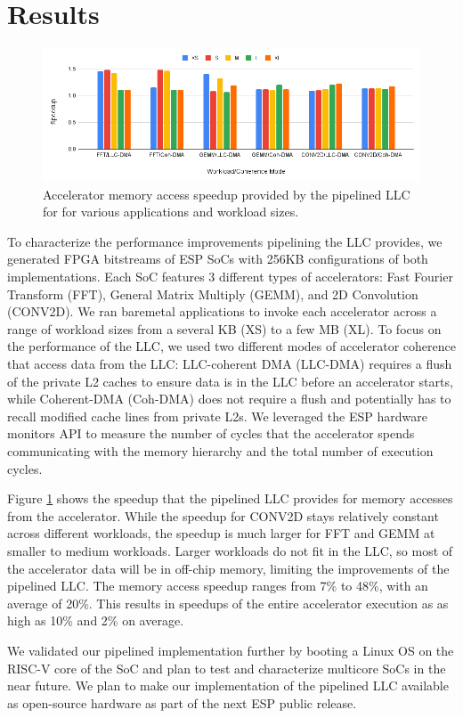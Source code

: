 \section{Results}
\label{sec:performanceTestResults}
\begin{figure}[t]
    \centering
    \captionsetup{justification=centering, format=hang}
    \includegraphics[width=1\linewidth]{fig/DMA_chart.png}
    \caption{Accelerator memory access speedup provided by the pipelined LLC for for various applications and workload sizes.}
    \label{fig:dma_chart}
\end{figure}

To characterize the performance improvements pipelining the LLC provides, we
generated FPGA bitstreams of ESP SoCs with 256KB configurations of both
implementations. Each SoC features 3 different types of accelerators: Fast
Fourier Transform (FFT), General Matrix Multiply (GEMM), and 2D Convolution
(CONV2D). We ran baremetal applications to invoke each accelerator across a
range of workload sizes from a several KB (XS) to a few MB (XL).  To
focus on the performance of the LLC, we used two different modes of accelerator
coherence that access data from the LLC: LLC-coherent DMA (LLC-DMA)
requires a flush of the private L2 caches to ensure data is in the LLC before an
accelerator starts, while Coherent-DMA (Coh-DMA) does not require a flush and
potentially has to recall modified cache lines from private L2s. We leveraged
the ESP hardware monitors API to measure the number of cycles that the
accelerator spends communicating with the memory hierarchy and the total number
of execution cycles.

\par Figure \ref{fig:dma_chart} shows the speedup that the pipelined LLC
provides for memory accesses from the accelerator.  While the speedup for
CONV2D stays relatively constant across different workloads, the speedup is
much larger for FFT and GEMM at smaller to medium workloads. Larger workloads
do not fit in the LLC, so most of the accelerator data will be in off-chip
memory, limiting the improvements of the pipelined LLC. The memory access
speedup ranges from 7\% to 48\%, with an average of 20\%. This results in
speedups of the entire accelerator execution as as high as 10\% and 2\% on
average.

We validated our pipelined implementation further by booting a Linux OS on the
RISC-V core of the SoC and plan to test and characterize multicore SoCs in the
near future. We plan to make our implementation of the pipelined LLC available
as open-source hardware as part of the next ESP public release.
